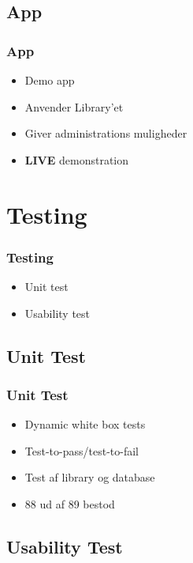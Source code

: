 \documentclass{beamer}
\begin{document}
\subsection{App}

\begin{frame}
	\frametitle{App}
	\begin{itemize}
		\item Demo app
		\item Anvender Library'et
		\item Giver administrations muligheder
		\item \textbf{LIVE} demonstration
	\end{itemize}
\end{frame}

\section{Testing}

\begin{frame}
	\frametitle{Testing}
	\begin{itemize}
		\item Unit test
		\item Usability test
	\end{itemize}
\end{frame}

\subsection{Unit Test}

\begin{frame}
	\frametitle{Unit Test}
	\begin{itemize}
		\item Dynamic white box tests
		\item Test-to-pass/test-to-fail
		\item Test af library og database
		\item 88 ud af 89 bestod
	\end{itemize}
\end{frame}

\subsection{Usability Test}
\end{document}
